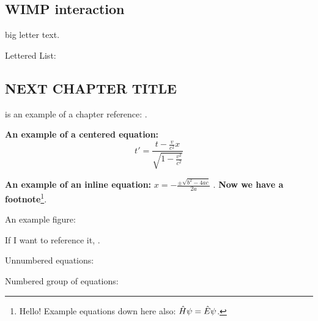 \subsection{WIMP interaction} \label{sec:wimp}



 big letter text. \lipsum[5] 

Lettered List: 


\subsection{NEXT CHAPTER TITLE}

 is an example of a chapter reference: . \lipsum[1]

\lipsum[2-2] \textbf{An example of a centered equation:} \[
    t' = \frac{t - \frac{v}{c^2}x}{\sqrt{1 - \frac{v^2}{c^2}}}
\]

\lipsum[3-3] \textbf{An example of an inline equation:} $x = -\frac{\pm \sqrt{b^2 - 4ac}}{2a}$ \lipsum[4-4]. \textbf{Now we have a footnote}\footnote{Hello! Example equations down here also: $\hat{H} \psi = \hat{E}\psi$.}.

An example figure: 

If I want to reference it, .

Unnumbered equations:

Numbered group of equations:
